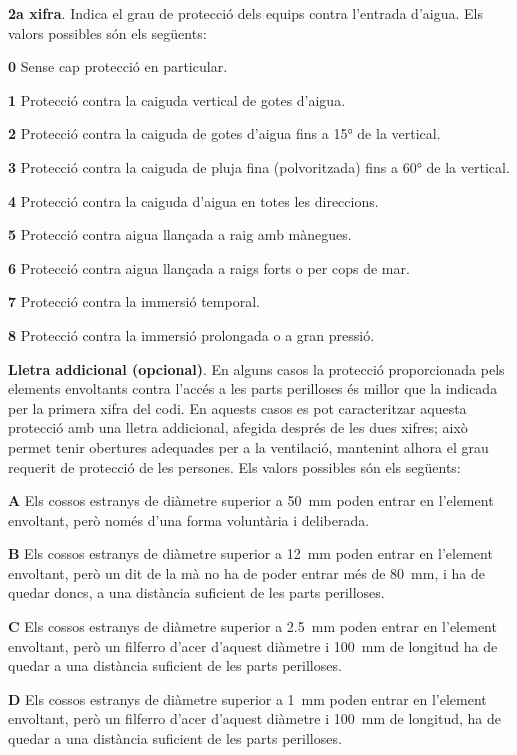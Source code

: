 \textbf{2a xifra}. Indica el grau de protecció dels equips contra
l'entrada d'aigua. Els valors possibles són els següents:
\begin{list}{}
   {\setlength{\labelwidth}{10mm} \setlength{\leftmargin}{10mm} \setlength{\labelsep}{2mm}}
   \item[\textbf{0}] Sense cap protecció en particular.
   \item[\textbf{1}] Protecció contra la caiguda vertical de gotes d'aigua.
   \item[\textbf{2}] Protecció contra la caiguda de gotes d'aigua fins a \ang{15} de la  vertical.
   \item[\textbf{3}] Protecció contra la caiguda de pluja fina (polvoritzada) fins a \ang{60} de la  vertical.
   \item[\textbf{4}] Protecció contra la caiguda d'aigua en totes les direccions.
   \item[\textbf{5}] Protecció contra aigua llançada a raig amb mànegues.
   \item[\textbf{6}] Protecció contra aigua llançada a raigs forts o per cops de mar.
   \item[\textbf{7}] Protecció contra la immersió temporal.
   \item[\textbf{8}] Protecció contra la immersió prolongada o a gran pressió.
\end{list}


\textbf{Lletra addicional (opcional)}. En alguns casos la protecció
proporcionada pels elements envoltants contra l'accés a les parts
perilloses és millor que la indicada per la primera xifra del codi.
En aquests casos es pot caracteritzar aquesta protecció amb una
lletra addicional, afegida després de les dues xifres; això permet
tenir obertures adequades per a la ventilació,  mantenint alhora el
grau requerit de protecció de les persones. Els valors possibles són
els següents:
\begin{list}{}
   {\setlength{\labelwidth}{10mm} \setlength{\leftmargin}{10mm} \setlength{\labelsep}{2mm}}
   \item[\textbf{A}] Els  cossos estranys de diàmetre superior a
   \SI{50}{mm}    poden entrar en l'element envoltant, però només d'una forma voluntària i deliberada.
   \item[\textbf{B}] Els  cossos estranys de diàmetre superior a \SI{12}{mm}
    poden entrar en l'element envoltant, però un dit de la mà no ha de poder entrar més de \SI{80}{mm}, i
    ha de quedar doncs, a una distància    suficient de les parts perilloses.
   \item[\textbf{C}] Els  cossos estranys de diàmetre superior a \SI{2,5}{mm}
   poden entrar en l'element envoltant, però un filferro d'acer d'aquest diàmetre i \SI{100}{mm}
   de longitud ha de quedar a una distància suficient de les parts perilloses.
   \item[\textbf{D}] Els  cossos estranys de diàmetre superior a \SI{1}{mm}
   poden entrar en l'element envoltant, però un filferro d'acer d'aquest diàmetre i \SI{100}{mm}
   de longitud, ha de quedar a una distància suficient de les parts perilloses.
\end{list}

